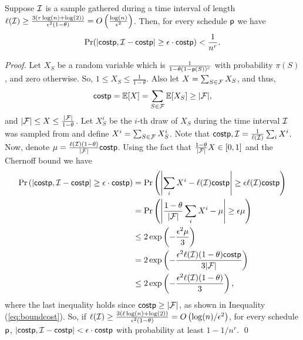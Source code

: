 \begin{theorem}\label{thm:chernoffcost}
	Suppose $\mathcal{I}$ is a sample gathered during a time interval of length $\ell(\mathcal{I})
	\geq \frac{3(r\log(n)+\log(2))}{\epsilon^2(1-\theta)} =
	O\left(\frac{\log(n)}{\epsilon^2}\right)$. Then, for every schedule $\mathsf{p}$ we have
	$$\Pr(|\mathsf{cost}{\mathsf{p},\mathcal{I}} - \mathsf{cost}{\mathsf{p}}|\geq \epsilon\cdot\mathsf{cost}{\mathsf{p}}) < \frac{1}{n^r}.$$
\end{theorem}

\begin{proof}
	Let $X_S$ be a random variable which is $\frac{1}{1-\theta(1-\mathsf{p}(S))^c}$ with probability $\pi(S)$, and zero otherwise. So, $1\leq X_S \leq \frac{1}{1-\theta}$. Also let  $X = \sum_{S\in \mathcal{F}} X_S$, and thus,
	\begin{equation}\label{eq:boundcost}
		\mathsf{cost}{\mathsf{p}} = \mathbb{E}[X] = \sum_{S\in\mathcal{F}} \mathbb{E}[X_{S}] \geq |\mathcal{F}|,
\end{equation}
and $|\mathcal{F}| \leq X \leq \frac{|\mathcal{F}|}{1-\theta}$. Let $X^i_S$ be the $i$-th draw of $X_S$ during the time interval $\mathcal{I}$ was sampled from and define $X^i = \sum_{S\in\mathcal{F}}X_S^i$. Note that
$\mathsf{cost}{\mathsf{p},\mathcal{I}} = \frac{1}{\ell(\mathcal{I})}\sum_{i}X^i$. Now, denote $\mu=\frac{\ell(\mathcal{I})(1-\theta)}{|\mathcal{F}|}\mathsf{cost}{\mathsf{p}}$. Using the fact that $\frac{1-\theta}{|\mathcal{F}|}X \in [0,1]$ and the Chernoff bound we have
\begin{align*}
\Pr\left(\left|\mathsf{cost}{\mathsf{p},\mathcal{I}} - \mathsf{cost}{\mathsf{p}}\right| \geq \epsilon \cdot
\mathsf{cost}{\mathsf{p}}\right)
&=
\Pr\left(\left|\sum_i X^i - \ell(\mathcal{I})\mathsf{cost}{\mathsf{p}}\right| \geq \epsilon
\ell(\mathcal{I}) \mathsf{cost}{\mathsf{p}}\right) \\
&=
\Pr\left(\left|\frac{1-\theta}{|\mathcal{F}|}\sum_i X^i - \mu\right| \geq \epsilon
\mu\right) \\
&\leq 2\exp\left(-\frac{\epsilon^2\mu}{3}\right)\\
&=
2\exp\left(-\frac{\epsilon^2 \ell(\mathcal{I}) (1-\theta)
	\mathsf{cost}{\mathsf{p}}}{3|\mathcal{F}|}\right) \\
&\leq
2\exp\left(-\frac{\epsilon^2 \ell(\mathcal{I}) (1-\theta)}{3}\right),
\end{align*}
where the last inequality holds since $\mathsf{cost}{\mathsf{p}}\geq |\mathcal{F}|$, as shown in Inequality (\ref{eq:boundcost}).
So, if $\ell(\mathcal{I}) \geq \frac{3 (\ell \log(n)+\log(2))}{\epsilon^2(1-\theta)}
= O\left(\log(n)/\epsilon^2\right)$, for every schedule $\mathsf{p}$, $\left|\mathsf{cost}{\mathsf{p},\mathcal{I}} - \mathsf{cost}{\mathsf{p}}\right| < \epsilon \cdot \mathsf{cost}{\mathsf{p}}$ with probability at least $1-1/n^r$.
\qed
\end{proof}


